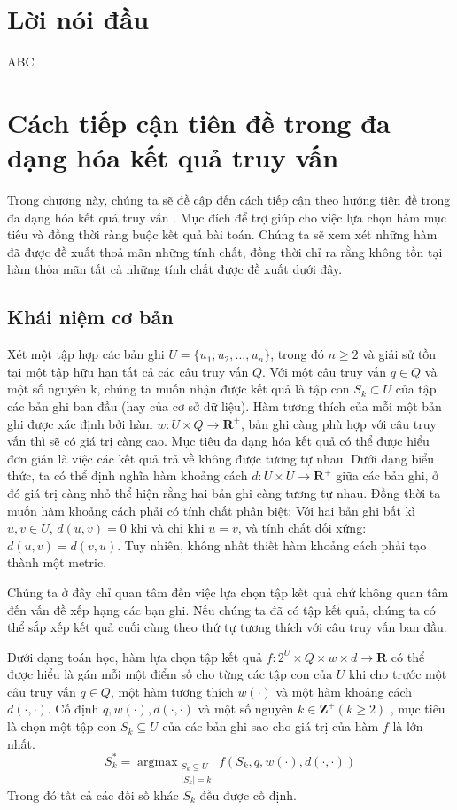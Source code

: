 \documentclass[12pt]{report}
\DeclareMathOperator*{\argmax}{argmax}
\begin{document}
\newpage
\setcounter{page}{1}

\section*{Lời nói đầu}
ABC
\section{Cách tiếp cận tiên đề trong đa dạng hóa kết quả truy vấn}
Trong chương này, chúng ta sẽ đề cập đến cách tiếp cận 
theo hướng tiên đề trong đa dạng hóa kết quả truy vấn \cite{diversification}. 
Mục đích để trợ giúp cho việc lựa chọn hàm mục tiêu và đồng thời 
ràng buộc kết quả bài toán.
Chúng ta sẽ xem xét những hàm đã được đề xuất thoả mãn những tính chất, đồng thời chỉ ra rằng không tồn tại hàm thỏa mãn tất cả những tính chất được đề xuất dưới đây. 
\subsection{Khái niệm cơ bản}
Xét một tập hợp các bản ghi $U=\{u_1, u_2, ..., u_n\}$, trong đó $n \geq 2$
và giải sử tồn tại một tập hữu hạn tất cả các câu truy vấn $Q$. 
Với một câu truy vấn $q \in Q$ và một số nguyên k, chúng ta muốn nhận được kết quả là tập con $S_k \subset U$ của tập các bản ghi ban đầu (hay của cơ sở dữ liệu). 
Hàm tương thích của mỗi một bản ghi được xác định bởi hàm 
$w: U \times Q \to \mathbf{R}^+$, bản ghi càng phù hợp với câu truy vấn 
thì sẽ có giá trị càng cao. Mục tiêu đa dạng hóa kết quả có thể được hiểu đơn giản là việc các kết quả trả về không được tương tự nhau. Dưới dạng biểu thức, ta có thể định nghĩa hàm khoảng cách $d: U \times U \to \mathbf{R}^+$ giữa các bản ghi, ở đó giá trị càng nhỏ thể hiện rằng hai bản ghi càng tương tự nhau. Đồng thời ta muốn hàm khoảng cách phải có tính chất phân biệt: Với hai bản ghi bất kì $u, v \in U$, $d(u, v) = 0$ khi và chỉ khi $u = v$, và tính chất đối xứng: $d(u, v) = d(v, u)$. Tuy nhiên, không nhất thiết hàm khoảng cách phải tạo thành một metric. 

Chúng ta ở đây chỉ quan tâm đến việc lựa chọn tập kết quả chứ không quan tâm đến vấn đề xếp hạng các bạn ghi. Nếu chúng ta đã có tập kết quả, chúng ta có thể sắp xếp kết quả cuối cùng theo thứ tự tương thích với câu truy vấn ban đầu. 

Dưới dạng toán học, hàm lựa chọn tập kết quả $f: 2^U \times Q \times w \times d \to \mathbf{R}$ có thể được hiểu là gán mỗi một điểm số cho từng các tập con của $U$ khi cho trước một câu truy vấn $q \in Q$, một hàm tương 
thích $w(\cdot)$ và một hàm khoảng cách $d(\cdot, \cdot)$.
Cố định $q, w(\cdot), d(\cdot, \cdot)$ và một số nguyên $k \in \mathbf{Z}^+ (k \geq 2)$
, mục tiêu là chọn một tập con $S_k \subseteq U$ của các bản ghi sao cho giá trị của hàm $f$ là lớn nhất. 
$$S^*_k = \argmax_{\substack{S_k \subseteq U \\ |S_k| = k}}
f(S_k, q, w(\cdot), d(\cdot, \cdot)) $$
Trong đó tất cả các đối số khác $S_k$ đều được cố định. 
\end{document}
